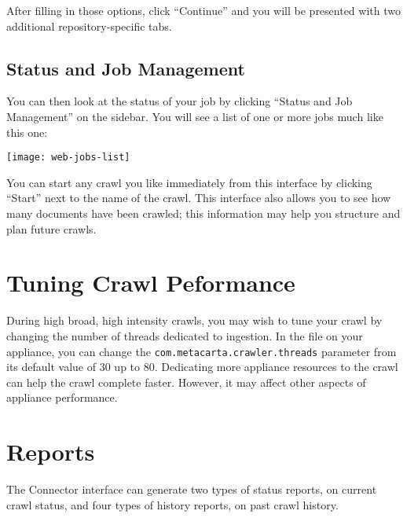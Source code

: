 \begin{changemargin}{1.5in}{0in}
\begin{itemize}
\end{itemize}

After filling in those options, click ``Continue'' and you will be
presented with two additional repository-specific tabs.



\subsection{\label{ManageJobs}Status and Job Management}

You can then look at the status of your job by clicking ``Status and 
Job Management'' on the sidebar. You will see a list of one or more jobs
much like this one:

\texttt{[image: web-jobs-list]}

You can start any crawl you like immediately from this interface by
clicking ``Start'' next to the name of the crawl. This interface also
allows you to see how many documents have been crawled; this information
may help you structure and plan future crawls.


\section{Tuning Crawl Peformance}

During high broad, high intensity crawls, you may wish to tune your
crawl by changing the number of threads dedicated to ingestion. In the
file  on your appliance, you
can change the \texttt{com.metacarta.crawler}\linebreak\texttt{.threads} parameter from
its default value of 30 up to 80. Dedicating more appliance resources
to the crawl can help the crawl complete faster. However, it may
affect other aspects of appliance performance.



\section{Reports}

The Connector interface can generate two types of status reports, on
current crawl status, and four types of history reports, on past crawl
history.


\end{changemargin}
